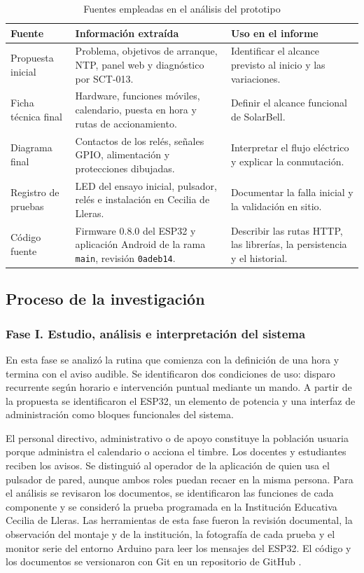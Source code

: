 \documentclass[a4paper,11pt]{article}
\newcommand{\senal}[1]{\texttt{#1}}
\begin{document}
\begin{table}[H]
\centering\small
\caption{Fuentes empleadas en el análisis del prototipo}
\begin{tabularx}{\linewidth}{@{}P{3.3cm}YY@{}}
\toprule
\textbf{Fuente} & \textbf{Información extraída} & \textbf{Uso en el informe} \\
\midrule
Propuesta inicial & Problema, objetivos de arranque, NTP, panel web y diagnóstico por SCT-013. & Identificar el alcance previsto al inicio y las variaciones. \\
Ficha técnica final & Hardware, funciones móviles, calendario, puesta en hora y rutas de accionamiento. & Definir el alcance funcional de SolarBell. \\
Diagrama final & Contactos de los relés, señales GPIO, alimentación y protecciones dibujadas. & Interpretar el flujo eléctrico y explicar la conmutación. \\
Registro de pruebas & LED del ensayo inicial, pulsador, relés e instalación en Cecilia de Lleras. & Documentar la falla inicial y la validación en sitio. \\
Código fuente & Firmware 0.8.0 del ESP32 y aplicación Android de la rama \senal{main}, revisión \senal{0adeb14}. & Describir las rutas HTTP, las librerías, la persistencia y el historial. \\
\bottomrule
\end{tabularx}
\end{table}

\subsection{Proceso de la investigación}
\subsubsection{Fase I. Estudio, análisis e interpretación del sistema}
En esta fase se analizó la rutina que comienza con la definición de una hora y termina con el aviso audible. Se identificaron dos condiciones de uso: disparo recurrente según horario e intervención puntual mediante un mando. A partir de la propuesta se identificaron el ESP32, un elemento de potencia y una interfaz de administración como bloques funcionales del sistema.

El personal directivo, administrativo o de apoyo constituye la población usuaria porque administra el calendario o acciona el timbre. Los docentes y estudiantes reciben los avisos. Se distinguió al operador de la aplicación de quien usa el pulsador de pared, aunque ambos roles puedan recaer en la misma persona. Para el análisis se revisaron los documentos, se identificaron las funciones de cada componente y se consideró la prueba programada en la Institución Educativa Cecilia de Lleras. Las herramientas de esta fase fueron la revisión documental, la observación del montaje y de la institución, la fotografía de cada prueba y el monitor serie del entorno Arduino para leer los mensajes del ESP32. El código y los documentos se versionaron con Git en un repositorio de GitHub \cite{repo}.
\end{document}

